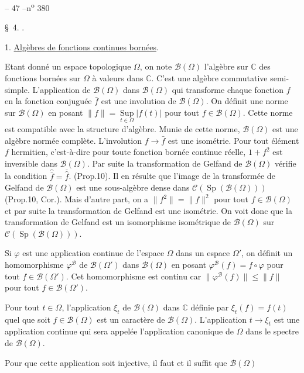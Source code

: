 \begin{center}-- 47 --\hfill n\textsuperscript{o} 380\end{center}
\begin{center}\S\ 4. .\end{center}
1. \uline{Algèbres de fonctions continues bornées}.

Etant donné un espace topologique $\Omega$, on note $\mathcal B(\Omega)$ l'algèbre sur $\mathbb C$ des fonctions  bornées sur $\Omega$ à valeurs dans $\mathbb C$. C'est une algèbre commutative semi-simple. L'application de $\mathcal B(\Omega)$ dans $\mathcal B(\Omega)$ qui transforme chaque fonction $f$ en la fonction conjuguée $\bar f$ est une involution de $\mathcal B(\Omega)$. On définit une norme sur $\mathcal B(\Omega)$ en posant $\lVert f\rVert=\underset{t\in\Omega}{\operatorname{Sup}}|f(t)|$ pour tout $f\in\mathcal B(\Omega)$. Cette norme est compatible avec la structure d'algèbre. Munie de cette norme, $\mathcal B(\Omega)$ est une algèbre normée complète. L'involution $f\longrightarrow\bar f$ est une isométrie. Pour tout élément $f$ hermitien, c'est-à-dire pour toute fonction bornée continue réelle, $1+f^2$ est inversible dans $\mathcal B(\Omega)$. Par suite la transformation de Gelfand de $\mathcal B(\Omega)$ vérifie la condition $\widehat{\bar f}=\overline{\hat f}$. (Prop.10). Il en résulte que l'image de la transformée de Gelfand de $\mathcal B(\Omega)$ est une sous-algèbre dense dans $\mathcal C(\operatorname{Sp}(\mathcal B(\Omega)))$ (Prop.10, Cor.\quad). Mais d'autre part, on a $\lVert f^2\rVert=\lVert f\rVert^2$ pour tout $f\in\mathcal B(\Omega)$ et par suite la transformation de Gelfand est une isométrie. On voit donc que la transformation de Gelfand est un isomorphisme isométrique de $\mathcal B(\Omega)$ sur $\mathcal C(\operatorname{Sp}(\mathcal B(\Omega)))$.

Si $\varphi$ est une application continue de l'espace $\Omega$ dans un espace $\Omega'$, on définit un homomorphisme $\varphi^{\mathcal B}$ de $\mathcal B(\Omega')$ dans $\mathcal B(\Omega)$ en posant $\varphi^{\mathcal B}(f)=f\circ\varphi$ pour tout $f\in\mathcal B(\Omega')$. Cet homomorphisme est continu car $\lVert\varphi^{\mathcal B}(f)\rVert\leq\lVert f\rVert$ pour tout $f\in\mathcal B(\Omega')$.

Pour tout $t\in\Omega$, l'application $\xi_t$ de $\mathcal B(\Omega)$ dans $\mathbb C$ définie par $\xi_t(f)=f(t)$ quel que soit $f\in\mathcal B(\Omega)$ est un caractère de $\mathcal B(\Omega)$. L'application $t\longrightarrow\xi_t$ est une application continue qui sera appelée l'application canonique de $\Omega$ dans le spectre de $\mathcal B(\Omega)$.

Pour que cette application soit injective, il faut et il suffit que $\mathcal B(\Omega)$
